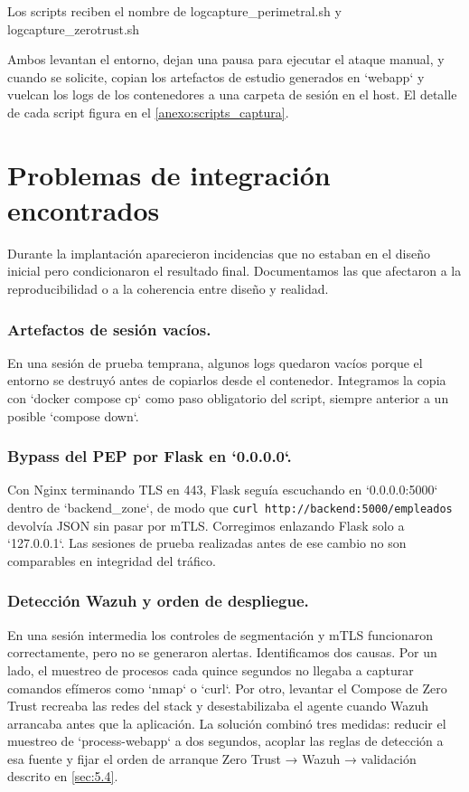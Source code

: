 \documentclass[11pt,spanish,listoffigures,listoftables]{tfgetsinf}
\begin{document}
    Los scripts reciben el nombre de logcapture\_perimetral.sh y logcapture\_zerotrust.sh

    Ambos levantan el entorno, dejan una pausa para ejecutar el ataque manual, y cuando se solicite, copian los artefactos de estudio generados en `webapp` y vuelcan los logs de los contenedores a una carpeta de sesión en el host. El detalle de cada script figura en el \ref{anexo:scripts_captura}.
    
    \section{Problemas de integración encontrados}
    Durante la implantación aparecieron incidencias que no estaban en el diseño inicial pero condicionaron el resultado final. Documentamos las que afectaron a la reproducibilidad o a la coherencia entre diseño y realidad.
    
    \subsubsection{Artefactos de sesión vacíos.} 
    En una sesión de prueba temprana, algunos logs quedaron vacíos porque el entorno se destruyó antes de copiarlos desde el contenedor. Integramos la copia con `docker compose cp` como paso obligatorio del script, siempre anterior a un posible `compose down`.
    
    \subsubsection{Bypass del PEP por Flask en `0.0.0.0`.} 
    Con Nginx terminando TLS en 443, Flask seguía escuchando en `0.0.0.0:5000` dentro de `backend\_zone`, de modo que \texttt{curl http://backend:5000/empleados} devolvía JSON sin pasar por mTLS. Corregimos enlazando Flask solo a `127.0.0.1`. Las sesiones de prueba realizadas antes de ese cambio no son comparables en integridad del tráfico.
    
    \subsubsection{Detección Wazuh y orden de despliegue.}
    En una sesión intermedia los controles de segmentación y mTLS funcionaron correctamente, pero no se generaron alertas. Identificamos dos causas. Por un lado, el muestreo de procesos cada quince segundos no llegaba a capturar comandos efímeros como `nmap` o `curl`. Por otro, levantar el Compose de Zero Trust recreaba las redes del stack y desestabilizaba el agente cuando Wazuh arrancaba antes que la aplicación. La solución combinó tres medidas: reducir el muestreo de `process-webapp` a dos segundos, acoplar las reglas de detección a esa fuente y fijar el orden de arranque Zero Trust → Wazuh → validación descrito en \cref{sec:5.4}.
\end{document}
